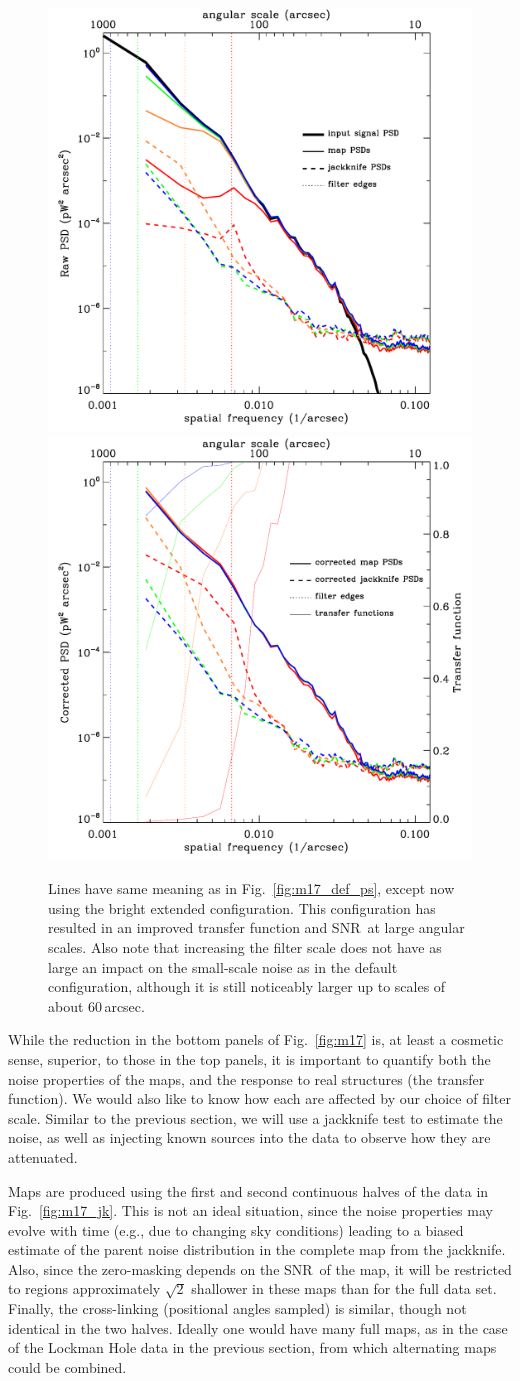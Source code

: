\documentclass[useAMS,usenatbib,nofootinbib]{mn2e}
\newcommand{\snr}{SNR}
\begin{document}
\begin{figure}
\centering
\includegraphics[width=0.49\linewidth]{pspec_m17_bright_extended.pdf}
\includegraphics[width=0.49\linewidth]{cor_pspec_m17_bright_extended.pdf}
\caption{Lines have same meaning as in Fig.~\ref{fig:m17_def_ps},
except now using the bright extended configuration. This configuration
has resulted in an improved transfer function and \snr\ at large
angular scales. Also note that increasing the filter scale does not
have as large an impact on the small-scale noise as in the default
configuration, although it is still noticeably larger up to scales of
about 60\,arcsec.}
\label{fig:m17_be_ps}
\end{figure}

While the reduction in the bottom panels of Fig.~\ref{fig:m17} is, at
least a cosmetic sense, superior, to those in the top panels, it is
important to quantify both the noise properties of the maps, and the
response to real structures (the transfer function). We would also
like to know how each are affected by our choice of filter scale.
Similar to the previous section, we will use a jackknife test to
estimate the noise, as well as injecting known sources into the data
to observe how they are attenuated.

Maps are produced using the first and second continuous halves of the
data in Fig.~\ref{fig:m17_jk}. This is not an ideal situation, since
the noise properties may evolve with time (e.g., due to changing sky
conditions) leading to a biased estimate of the parent noise
distribution in the complete map from the jackknife. Also, since the
zero-masking depends on the \snr\ of the map, it will be restricted to
regions approximately $\sqrt{2}$ shallower in these maps than for the
full data set. Finally, the cross-linking (positional angles sampled)
is similar, though not identical in the two halves. Ideally one would
have many full maps, as in the case of the Lockman Hole data in the
previous section, from which alternating maps could be combined.
\end{document}
